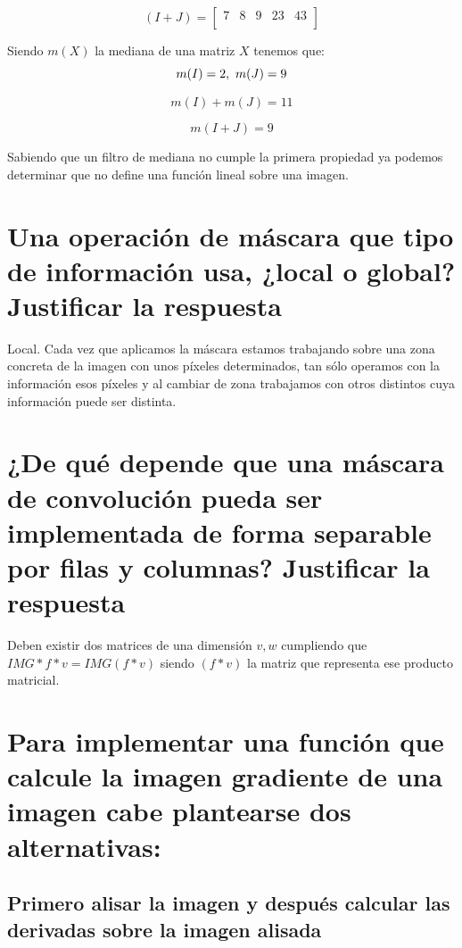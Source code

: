 \documentclass{article}
\begin{document}
\begin{equation}
(I+J) = \begin{bmatrix}
7 & 8 & 9 & 23 & 43 \\ 
\end{bmatrix}
\end{equation}

Siendo $m(X)$ la mediana de una matriz $X$ tenemos que:
\begin{equation}
m(I) = 2 ,\\\ m(J) = 9
\end{equation}

\begin{equation}
m(I)+m(J) = 11
\end{equation}

\begin{equation}
m(I + J) = 9
\end{equation}

Sabiendo que un filtro de mediana no cumple la primera propiedad ya podemos determinar que no define una función lineal sobre una imagen.

\section{Una operación de máscara que tipo de información usa, ¿local o global? Justificar la respuesta}
Local. Cada vez que aplicamos la máscara estamos trabajando sobre una zona concreta de la imagen con unos píxeles determinados, tan sólo operamos con la información esos píxeles y al cambiar de zona trabajamos con otros distintos cuya información puede ser distinta.

\section{¿De qué depende que una máscara de convolución pueda ser implementada de forma separable por filas y columnas? Justificar la respuesta}

Deben existir dos matrices de una dimensión $v, w$ cumpliendo que $IMG * f * v = IMG(f * v)$ siendo $(f*v)$ la matriz que representa ese producto matricial.


\section{Para implementar una función que calcule la imagen gradiente de una imagen cabe plantearse dos alternativas:}

\subsection{Primero alisar la imagen y después calcular las derivadas sobre la imagen alisada }
\end{document}

